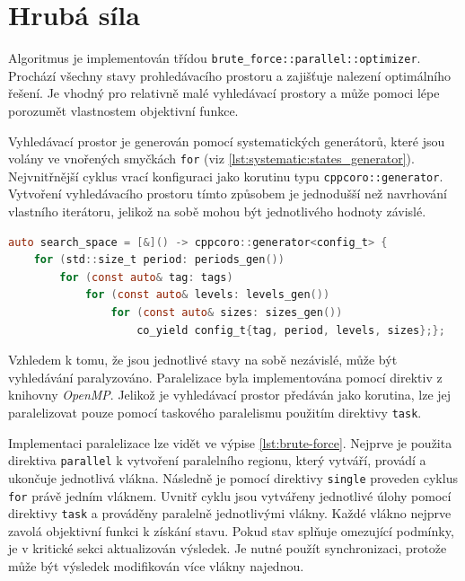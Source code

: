 \section{Hrubá síla}
Algoritmus je implementován třídou \texttt{brute\_force::parallel::optimizer}.
Prochází všechny stavy prohledávacího prostoru a zajišťuje nalezení optimálního řešení.
Je vhodný pro relativně malé vyhledávací prostory a může pomoci lépe porozumět vlastnostem objektivní funkce.

Vyhledávací prostor je generován pomocí systematických generátorů, které jsou volány ve vnořených smyčkách \texttt{for} (viz \ref{lst:systematic:states_generator}).
Nejvnitřnější cyklus vrací konfiguraci jako korutinu typu \texttt{cppcoro::generator}.
Vytvoření vyhledávacího prostoru tímto způsobem je jednodušší než navrhování vlastního iterátoru, jelikož na sobě mohou být jednotlivého hodnoty závislé.

\clearpage
\begin{lstlisting}[caption={~Generování systematického stavového prostoru},label={lst:systematic:states_generator},captionpos=t,abovecaptionskip=-\medskipamount,belowcaptionskip=\medskipamount,language=C]
auto search_space = [&]() -> cppcoro::generator<config_t> {
    for (std::size_t period: periods_gen())
        for (const auto& tag: tags)
            for (const auto& levels: levels_gen())
                for (const auto& sizes: sizes_gen())
                    co_yield config_t{tag, period, levels, sizes};};
\end{lstlisting}

Vzhledem k tomu, že jsou jednotlivé stavy na sobě nezávislé, může být vyhledávání paralyzováno.
Paralelizace byla implementována pomocí direktiv z knihovny \textit{OpenMP}.
Jelikož je vyhledávací prostor předáván jako korutina, lze jej paralelizovat pouze pomocí taskového paralelismu použitím direktivy \texttt{task}.

Implementaci paralelizace lze vidět ve výpise \ref{lst:brute-force}.
Nejprve je použita direktiva \texttt{parallel} k vytvoření paralelního regionu, který vytváří, provádí a ukončuje jednotlivá vlákna.
Následně je pomocí direktivy \texttt{single} proveden cyklus \texttt{for} právě jedním vláknem.
Uvnitř cyklu jsou vytvářeny jednotlivé úlohy pomocí direktivy \texttt{task} a prováděny paralelně jednotlivými vlákny.
Každé vlákno nejprve zavolá objektivní funkci k získání stavu.
Pokud stav splňuje omezující podmínky, je v kritické sekci aktualizován výsledek.
Je nutné použít synchronizaci, protože může být výsledek modifikován více vlákny najednou.

